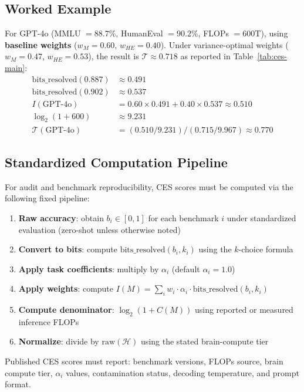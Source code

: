\documentclass[12pt]{article}
\begin{document}
\subsection{Worked Example}
\label{sec:worked-example}

For GPT-4o (MMLU $= 88.7\%$, HumanEval $= 90.2\%$, FLOPs $= 600$T), using \textbf{baseline weights} ($w_M=0.60$, $w_{HE}=0.40$). Under variance-optimal weights ($w_M=0.47$, $w_{HE}=0.53$), the result is $\mathcal{T} \approx 0.718$ as reported in Table~\ref{tab:ces-main}:
\begin{align}
\text{bits\_resolved}(0.887) &\approx 0.491 \\
\text{bits\_resolved}(0.902) &\approx 0.537 \\
I(\text{GPT-4o}) &= 0.60 \times 0.491 + 0.40 \times 0.537 \approx 0.510 \\
\log_2(1 + 600) &\approx 9.231 \\
\mathcal{T}(\text{GPT-4o}) &= (0.510/9.231)/(0.715/9.967) \approx 0.770
\end{align}

\subsection{Standardized Computation Pipeline}
\label{sec:pipeline}

For audit and benchmark reproducibility, CES scores must be computed via the following fixed pipeline:

\begin{enumerate}
    \item \textbf{Raw accuracy}: obtain $b_i \in [0,1]$ for each benchmark $i$ under standardized evaluation (zero-shot unless otherwise noted)
    \item \textbf{Convert to bits}: compute $\text{bits\_resolved}(b_i, k_i)$ using the $k$-choice formula
    \item \textbf{Apply task coefficients}: multiply by $\alpha_i$ (default $\alpha_i = 1.0$)
    \item \textbf{Apply weights}: compute $I(M) = \sum_i w_i \cdot \alpha_i \cdot \text{bits\_resolved}(b_i, k_i)$
    \item \textbf{Compute denominator}: $\log_2(1 + C(M))$ using reported or measured inference FLOPs
    \item \textbf{Normalize}: divide by $\text{raw}(\mathcal{H})$ using the stated brain-compute tier
\end{enumerate}

Published CES scores must report: benchmark versions, FLOPs source, brain compute tier, $\alpha_i$ values, contamination status, decoding temperature, and prompt format.
\end{document}
